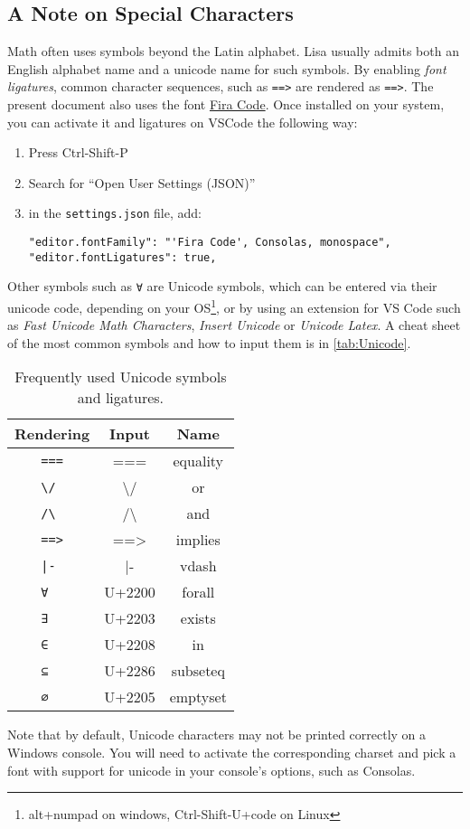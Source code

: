 \subsection*{A Note on Special Characters}
Math often uses symbols beyond the Latin alphabet. Lisa usually admits both an English alphabet name and a unicode name for such symbols. By enabling \emph{font ligatures}, common character sequences, such as \lstinline|=|\lstinline|=|\lstinline|>| are rendered as \lstinline|==>|. 
The present document also uses the font \href{https://github.com/tonsky/FiraCode}{Fira Code}. Once installed on your system, you can activate it and ligatures on VSCode the following way:
\begin{enumerate}
  \item Press Ctrl-Shift-P
  \item Search for ``Open User Settings (JSON)''
  \item in the \lstinline|settings.json| file, add:
  \begin{lstlisting}
"editor.fontFamily": "'Fira Code', Consolas, monospace",
"editor.fontLigatures": true,
  \end{lstlisting}
\end{enumerate}
Other symbols such as \lstinline|∀| are Unicode symbols, which can be entered via their unicode code, depending on your OS\footnote{alt+numpad on windows, Ctrl-Shift-U+code on Linux}, or by using an extension for VS Code such as \emph{Fast Unicode Math Characters}, \emph{Insert Unicode} or \emph{Unicode Latex}.
A cheat sheet of the most common symbols and how to input them is in \autoref{tab:Unicode}.
\begin{table}
  \center
  \begin{tabular}{c|c|c}
    Rendering         & Input            & Name     \\ \hline
    \lstinline| === | & ===              & equality \\ \hline
    \lstinline| \/  | & \textbackslash / & or       \\ \hline
    \lstinline| /\  | & /\textbackslash  & and      \\ \hline
    \lstinline| ==> | & ==>              & implies  \\ \hline
    \lstinline+ |-  + &  |-              & vdash    \\ \hline
    \lstinline| ∀   | & U+2200           & forall   \\ \hline
    \lstinline| ∃   | & U+2203           & exists   \\ \hline
    \lstinline| ∈   | & U+2208           & in       \\ \hline
    \lstinline| ⊆   | & U+2286           & subseteq \\ \hline
    \lstinline| ∅   | & U+2205           & emptyset \\ 
  \end{tabular}
  \caption{Frequently used Unicode symbols and ligatures.}
  \label{tab:Unicode}
\end{table}
Note that by default, Unicode characters may not be printed correctly on a Windows console. You will need to activate the corresponding charset and pick a font with support for unicode in your console's options, such as Consolas.

